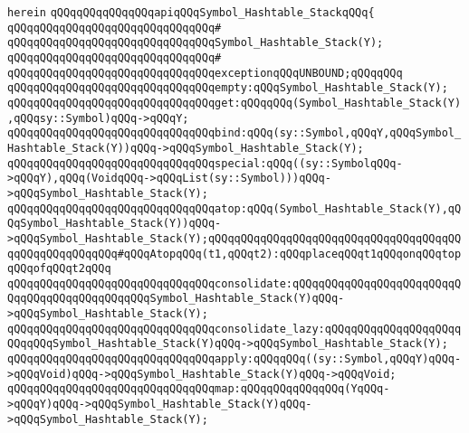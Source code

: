 \verb|herein|\newline
\newline
\verb|qQQqqQQqqQQqqQQqapiqQQqSymbol_Hashtable_StackqQQq{|\newline
\verb|qQQqqQQqqQQqqQQqqQQqqQQqqQQqqQQq#|\newline
\verb|qQQqqQQqqQQqqQQqqQQqqQQqqQQqqQQqSymbol_Hashtable_Stack(Y);|\newline
\verb|qQQqqQQqqQQqqQQqqQQqqQQqqQQqqQQq#|\newline
\verb|qQQqqQQqqQQqqQQqqQQqqQQqqQQqqQQqexceptionqQQqUNBOUND;qQQqqQQq|\newline
\newline
\verb|qQQqqQQqqQQqqQQqqQQqqQQqqQQqqQQqempty:qQQqSymbol_Hashtable_Stack(Y);|\newline
\verb|qQQqqQQqqQQqqQQqqQQqqQQqqQQqqQQqget:qQQqqQQq(Symbol_Hashtable_Stack(Y),qQQqsy::Symbol)qQQq->qQQqY;|\newline
\verb|qQQqqQQqqQQqqQQqqQQqqQQqqQQqqQQqbind:qQQq(sy::Symbol,qQQqY,qQQqSymbol_Hashtable_Stack(Y))qQQq->qQQqSymbol_Hashtable_Stack(Y);|\newline
\newline
\verb|qQQqqQQqqQQqqQQqqQQqqQQqqQQqqQQqspecial:qQQq((sy::SymbolqQQq->qQQqY),qQQq(VoidqQQq->qQQqList(sy::Symbol)))qQQq->qQQqSymbol_Hashtable_Stack(Y);|\newline
\newline
\verb|qQQqqQQqqQQqqQQqqQQqqQQqqQQqqQQqatop:qQQq(Symbol_Hashtable_Stack(Y),qQQqSymbol_Hashtable_Stack(Y))qQQq->qQQqSymbol_Hashtable_Stack(Y);qQQqqQQqqQQqqQQqqQQqqQQqqQQqqQQqqQQqqQQqqQQqqQQqqQQqqQQq#qQQqAtopqQQq(t1,qQQqt2):qQQqplaceqQQqt1qQQqonqQQqtopqQQqofqQQqt2qQQq|\newline
\newline
\verb|qQQqqQQqqQQqqQQqqQQqqQQqqQQqqQQqconsolidate:qQQqqQQqqQQqqQQqqQQqqQQqqQQqqQQqqQQqqQQqqQQqqQQqSymbol_Hashtable_Stack(Y)qQQq->qQQqSymbol_Hashtable_Stack(Y);|\newline
\verb|qQQqqQQqqQQqqQQqqQQqqQQqqQQqqQQqconsolidate_lazy:qQQqqQQqqQQqqQQqqQQqqQQqqQQqSymbol_Hashtable_Stack(Y)qQQq->qQQqSymbol_Hashtable_Stack(Y);|\newline
\newline
\verb|qQQqqQQqqQQqqQQqqQQqqQQqqQQqqQQqapply:qQQqqQQq((sy::Symbol,qQQqY)qQQq->qQQqVoid)qQQq->qQQqSymbol_Hashtable_Stack(Y)qQQq->qQQqVoid;|\newline
\verb|qQQqqQQqqQQqqQQqqQQqqQQqqQQqqQQqmap:qQQqqQQqqQQqqQQq(YqQQq->qQQqY)qQQq->qQQqSymbol_Hashtable_Stack(Y)qQQq->qQQqSymbol_Hashtable_Stack(Y);|\newline
